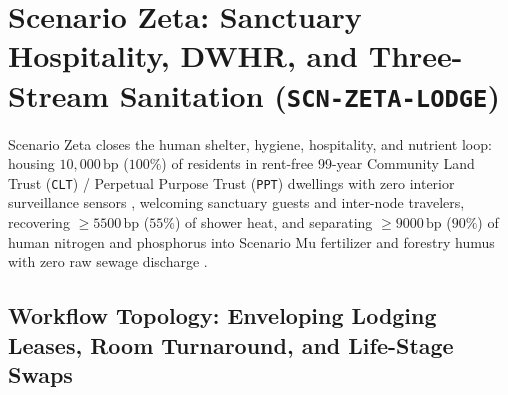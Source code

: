 \section{Scenario Zeta: Sanctuary Hospitality, DWHR, and Three-Stream Sanitation (\texttt{SCN-ZETA-LODGE})}
\label{sec:wave-c-zeta}

Scenario Zeta closes the human shelter, hygiene, hospitality, and nutrient loop: housing
$10{,}000\,\mathrm{bp}$ ($100\%$) of residents in rent-free 99-year Community Land Trust
(\texttt{CLT}) / Perpetual Purpose Trust (\texttt{PPT}) dwellings with zero interior
surveillance sensors \parencite{habraken1972supports}, welcoming sanctuary guests and
inter-node travelers, recovering $\ge 5500\,\mathrm{bp}$ ($55\%$) of shower heat, and
separating $\ge 9000\,\mathrm{bp}$ ($90\%$) of human nitrogen and phosphorus into Scenario
Mu fertilizer and forestry humus with zero raw sewage discharge \parencite{kadlec1996}.

\subsection{Workflow Topology: Enveloping Lodging Leases, Room Turnaround, and Life-Stage Swaps}

